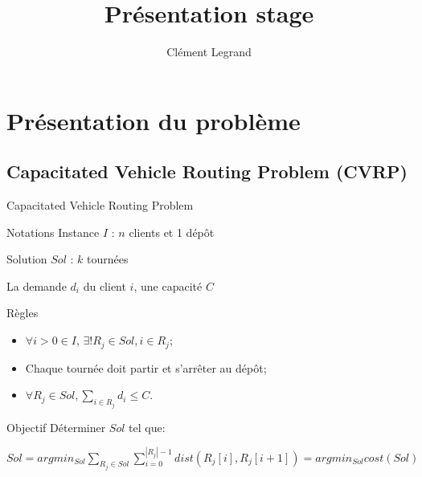 \documentclass{beamer}
\title{Présentation stage}
\author{Clément Legrand}
\begin{document}
\begin{frame}[plain]
\titlepage
\end{frame}

\section{Présentation du problème}

\subsection{Capacitated Vehicle Routing Problem (CVRP)}
\footnotesize
\begin{frame}{Capacitated Vehicle Routing Problem}
\begin{block}{Notations}
Instance $I$ : $n$ clients et 1 dépôt

Solution $Sol$ : $k$ tournées

La demande $d_i$ du client $i$, une capacité $C$
\end{block}
\begin{alertblock}{Règles}
\begin{itemize}
\item $\forall i > 0 \in I$, $\exists! R_j \in Sol, i \in R_j$;
\item Chaque tournée doit partir et s'arrêter au dépôt;
\item $ \forall R_j \in Sol, \sum_{i \in R_j} d_i \leq C$.
\end{itemize}
\end{alertblock}
\begin{exampleblock}{Objectif}
Déterminer $Sol$ tel que:

\centering
$ Sol = argmin_{Sol} \sum_{R_j \in Sol} \sum_{i = 0}^{|R_j|-1} dist(R_j[i],R_j[i+1]) = argmin_{Sol}cost(Sol)$
\end{exampleblock}
\end{frame}
\end{document}
